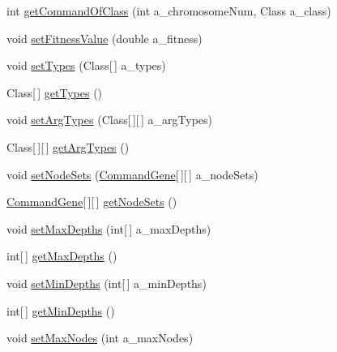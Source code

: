 \begin{DoxyCompactItemize}
int \hyperlink{interfaceorg_1_1jgap_1_1gp_1_1_i_g_p_program_a6299be773d5ae9ee4a554ba84677268a}{get\-Command\-Of\-Class} (int a\-\_\-chromosome\-Num, Class a\-\_\-class)
\item 
void \hyperlink{interfaceorg_1_1jgap_1_1gp_1_1_i_g_p_program_abb7e3858fed9ea4ac50c6841f27704dd}{set\-Fitness\-Value} (double a\-\_\-fitness)
\item 
void \hyperlink{interfaceorg_1_1jgap_1_1gp_1_1_i_g_p_program_acda6cbcb0dd4f9db114632f3131f817e}{set\-Types} (Class\mbox{[}$\,$\mbox{]} a\-\_\-types)
\item 
Class\mbox{[}$\,$\mbox{]} \hyperlink{interfaceorg_1_1jgap_1_1gp_1_1_i_g_p_program_a1b142513eca08b5f1b6d2be2d1b71a8c}{get\-Types} ()
\item 
void \hyperlink{interfaceorg_1_1jgap_1_1gp_1_1_i_g_p_program_a97f66bf3674c51d91b3127f9ec38e69a}{set\-Arg\-Types} (Class\mbox{[}$\,$\mbox{]}\mbox{[}$\,$\mbox{]} a\-\_\-arg\-Types)
\item 
Class\mbox{[}$\,$\mbox{]}\mbox{[}$\,$\mbox{]} \hyperlink{interfaceorg_1_1jgap_1_1gp_1_1_i_g_p_program_aa4f2e4767f1956eb04372d24a7d3c0b5}{get\-Arg\-Types} ()
\item 
void \hyperlink{interfaceorg_1_1jgap_1_1gp_1_1_i_g_p_program_a58842c54389449e100e2b9389cddd134}{set\-Node\-Sets} (\hyperlink{classorg_1_1jgap_1_1gp_1_1_command_gene}{Command\-Gene}\mbox{[}$\,$\mbox{]}\mbox{[}$\,$\mbox{]} a\-\_\-node\-Sets)
\item 
\hyperlink{classorg_1_1jgap_1_1gp_1_1_command_gene}{Command\-Gene}\mbox{[}$\,$\mbox{]}\mbox{[}$\,$\mbox{]} \hyperlink{interfaceorg_1_1jgap_1_1gp_1_1_i_g_p_program_a62f09a376cef8b874567b035f9cdebfe}{get\-Node\-Sets} ()
\item 
void \hyperlink{interfaceorg_1_1jgap_1_1gp_1_1_i_g_p_program_acf9a73bcc1709c585ac9c4f9a7978e90}{set\-Max\-Depths} (int\mbox{[}$\,$\mbox{]} a\-\_\-max\-Depths)
\item 
int\mbox{[}$\,$\mbox{]} \hyperlink{interfaceorg_1_1jgap_1_1gp_1_1_i_g_p_program_ac2f1dfc04362e7e0df543437e661ff55}{get\-Max\-Depths} ()
\item 
void \hyperlink{interfaceorg_1_1jgap_1_1gp_1_1_i_g_p_program_a70af48f66ed1dee7c412428b0571ab76}{set\-Min\-Depths} (int\mbox{[}$\,$\mbox{]} a\-\_\-min\-Depths)
\item 
int\mbox{[}$\,$\mbox{]} \hyperlink{interfaceorg_1_1jgap_1_1gp_1_1_i_g_p_program_a12acd91633a1ae6fdbf0a85d1ea10f53}{get\-Min\-Depths} ()
\item 
void \hyperlink{interfaceorg_1_1jgap_1_1gp_1_1_i_g_p_program_a814075394696bef7e497bc3047d5a2a3}{set\-Max\-Nodes} (int a\-\_\-max\-Nodes)

\end{DoxyCompactItemize}

